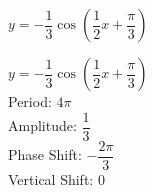{$y = -\dfrac{1}{3}\cos \left( \dfrac{1}{2}x + \dfrac{\pi}{3} \right)$}
{$y = -\dfrac{1}{3}\cos \left( \dfrac{1}{2}x + \dfrac{\pi}{3} \right)$\\
Period: $4\pi$\\
Amplitude: $\dfrac{1}{3}$\\
Phase Shift: $-\dfrac{2\pi}{3}$\\
Vertical Shift: $0$

\begin{center}
\end{center}
}
